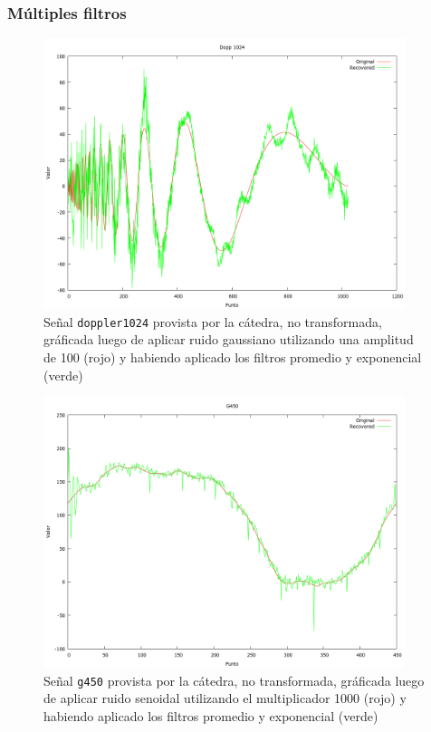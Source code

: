 \subsubsection{M\'ultiples filtros}

\begin{figure}[H]
\begin {center}
\includegraphics[width=299pt]{imagenes/dopp1024-gauss100-both.png}
\end {center}
\caption{Se\~nal \texttt{doppler1024} provista por la c\'atedra, no transformada, gr\'aficada
luego de aplicar ruido gaussiano utilizando una amplitud de 100 (rojo) y 
habiendo aplicado los filtros promedio y exponencial (verde)}
\label{fig:dopcomb}
\end{figure}

\begin{figure}[H]
\begin {center}
\includegraphics[width=299pt]{imagenes/g450-sin100-both.png}
\end {center}
\caption{Se\~nal \texttt{g450} provista por la c\'atedra, no transformada, gr\'aficada
luego de aplicar ruido senoidal utilizando el multiplicador 1000 (rojo) y 
habiendo aplicado los filtros promedio y exponencial (verde)}
\label{fig:gcomb}
\end{figure}

